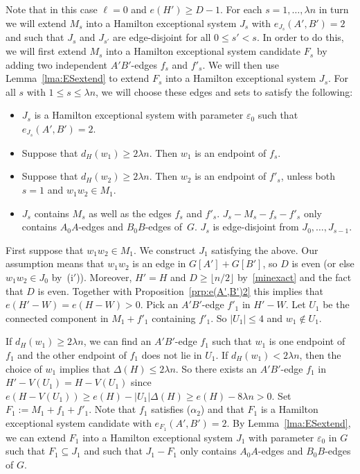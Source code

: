 \documentclass{memo-l}
\def\COMMENT#1{}
\def\eps{\varepsilon}
\numberwithin{section}{chapter}
\numberwithin{equation}{section}
\numberwithin{firstthm}{section}
\numberwithin{figure}{section}
\begin{document}
\noindent
Note that in this case $\ell =0$ and $e(H') \ge D-1$.
For each $s=1,\dots,\lambda n$ in turn we will extend $M_s$ into a Hamilton exceptional system $J_s$ with
$e_{J_s}(A',B') =2$ and such that $J_s$ and $J_{s'}$ are edge-disjoint for
all $0\le s' < s$. In order to do this, we will first extend $M_s$ into a Hamilton exceptional system candidate $F_s$
by adding two independent $A'B'$-edges $f_s$ and $f'_s$. We will then use Lemma~\ref{lma:ESextend}
to extend $F_s$ into a Hamilton exceptional system $J_s$. %
For all $s$ with $1\le s\le \lambda n$, we will choose these edges and sets to satisfy the following:
\begin{itemize}
\item[($\alpha_1$)] $J_s$ is a Hamilton exceptional system with parameter $\eps_0$ such that \break $e_{J_s}(A',B') = 2$. 
\item[($\alpha_2$)] Suppose that $d_{H}(w_1) \ge 2 \lambda n$. Then $w_1$ is an endpoint of $f_s$.  
\item[($\alpha_3$)] Suppose that $d_{H}(w_2) \ge 2 \lambda n$. Then $w_2$ is an endpoint of $f'_s$,
unless both $s=1$ and $w_1w_2\in M_1$.
\item[($\alpha_4$)] $J_s$ contains $M_s$ as well as the edges $f_s$ and $f'_{s}$.
$J_s -M_s-f_s-f'_s$ only contains $A_0A$-edges and $B_0B$-edges of~$G$.
$J_s$ is edge-disjoint from $J_0,\dots,J_{s-1}$.
\end{itemize}
First suppose that $w_1w_2 \in M_1$. We construct $J_1$ satisfying the above.
Our assumption means that $w_1w_2$ is an edge in $G[A'] +G[B']$, so $D$ is even (or else $w_1w_2 \in J_0$ by~(i$'$)).
Moreover, $H' = H$ and $D \ge \lfloor n/2 \rfloor$ by~\eqref{minexact} and the fact that $D$ is even.
Together with Proposition~\ref{prp:e(A',B')2} this implies that $e(H'-W) = e(H- W) >0$. 
Pick an $A'B'$-edge $f'_1$ in $H'-W$. Let $U_1$ be the connected component in $M_1+f'_1$ containing $f'_1$.
So $|U_1| \le 4$ and $w_1\notin U_1$.%
    \COMMENT{This holds since neither $w_1$ nor $w_2$ is an endpoint of $f'_1$ and $w_1w_2\in M_1$.}
If $d_{H}(w_1) \ge 2 \lambda n$, we can find an $A'B'$-edge $f_1$ such that $w_1$ is one endpoint of $f_1$
and the other endpoint of $f_1$ does not lie in $U_1$. If $d_{H}(w_1) < 2 \lambda n$, then the choice of $w_1$ implies that $\Delta(H) \le 2 \lambda n$.
So there exists an $A'B'$-edge $f_1$ in $H'-V(U_1) = H-V(U_1)$ since $e(H-V(U_1)) \ge e(H) - |U_1| \Delta(H) \ge e(H) - 8 \lambda n >0$. 
Set $F_1 := M_1 + f_1 +f'_1$. Note that $f_1$ satisfies ($\alpha_2$) and that $F_1$ is a Hamilton exceptional system candidate with $e_{F_1}(A',B') = 2$.
By Lemma~\ref{lma:ESextend}, we can extend $F_1$ into a Hamilton exceptional system $J_1$ with parameter $\eps_0$ in
$G$ such that $F_1 \subseteq J_1$ and such that $J_1 - F_1$ only contains $A_0A$-edges and $B_0B$-edges of $G$.
\end{document}
